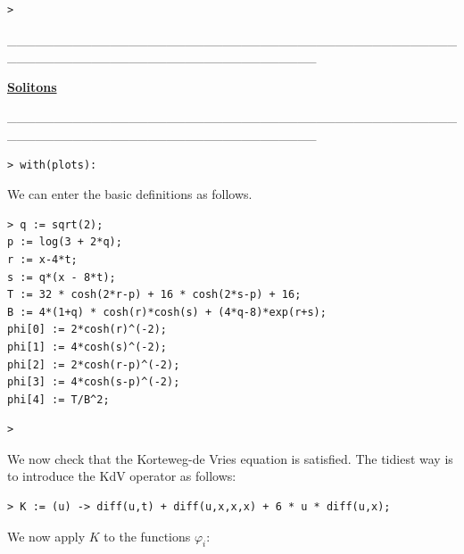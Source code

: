 \documentclass{article}
\begin{document}
\begin{lstlisting}
> 
\end{lstlisting}
\begin{Maple Normal}
\_\_\_\_\_\_\_\_\_\_\_\_\_\_\_\_\_\_\_\_\_\_\_\_\_\_\_\_\_\_\_\_\_\_\_\_\_\_\_\_\_\_\_\_\_\_\_\_\_\_\_\_\_\_\_\_\_\_\_\_\_\_\_\_\_\_\_\_\_\_\_\_\_\_\_\_\_\_\_\_\_
\end{Maple Normal}
\begin{Maple Normal}

\end{Maple Normal}
\begin{center}
\begin{Maple Normal}
\underline{\textbf{Solitons}}
\end{Maple Normal}
\end{center}
\begin{Maple Normal}
\_\_\_\_\_\_\_\_\_\_\_\_\_\_\_\_\_\_\_\_\_\_\_\_\_\_\_\_\_\_\_\_\_\_\_\_\_\_\_\_\_\_\_\_\_\_\_\_\_\_\_\_\_\_\_\_\_\_\_\_\_\_\_\_\_\_\_\_\_\_\_\_\_\_\_\_\_\_\_\_\_
\end{Maple Normal}
\begin{lstlisting}
> with(plots):
\end{lstlisting}
\begin{Maple Normal}
We can enter the basic definitions as follows.\


\end{Maple Normal}
\begin{lstlisting}
> q := sqrt(2);
p := log(3 + 2*q);
r := x-4*t;
s := q*(x - 8*t);
T := 32 * cosh(2*r-p) + 16 * cosh(2*s-p) + 16;
B := 4*(1+q) * cosh(r)*cosh(s) + (4*q-8)*exp(r+s);
phi[0] := 2*cosh(r)^(-2);
phi[1] := 4*cosh(s)^(-2);
phi[2] := 2*cosh(r-p)^(-2);
phi[3] := 4*cosh(s-p)^(-2);
phi[4] := T/B^2;
\end{lstlisting}
\begin{lstlisting}
> 
\end{lstlisting}
\begin{Maple Normal}

\end{Maple Normal}
\begin{Maple Normal}
We now check that the Korteweg-de Vries equation is satisfied.  The tidiest way is to introduce the KdV operator as follows:\


\end{Maple Normal}
\begin{lstlisting}
> K := (u) -> diff(u,t) + diff(u,x,x,x) + 6 * u * diff(u,x);
\end{lstlisting}
\begin{Maple Normal}
We now apply 
$K$ to the functions 
$\varphi_{i}$:
\end{Maple Normal}
\end{document}
